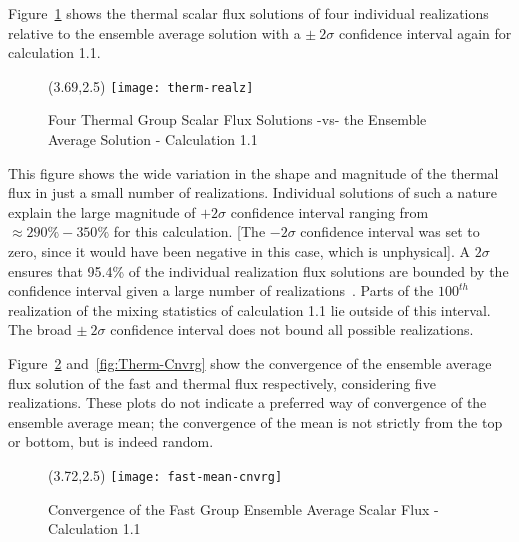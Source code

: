 \noindent
	\indent Figure~\ref{fig:Therm-Realz} shows the thermal scalar flux solutions of four individual 
	realizations relative to the ensemble average solution with a ${\pm \ 2\sigma}$ confidence
	interval again for calculation 1.1.
	\vspace{0.2in}
	\begin{figure}[htbp]
		\begin{center}
			\begin{minipage}[t]{3.69in}
			\begin{picture}(3.69,2.5)
	            	{\texttt{[image: therm-realz]}}
			\end{picture}
			\caption{\label{fig:Therm-Realz} Four Thermal Group Scalar Flux Solutions -vs- 
				the Ensemble Average Solution - Calculation 1.1}
			\end{minipage} %
		\end{center}
	\end{figure}	
	\vspace{-0.25in}
  	This figure shows the wide variation in the shape and magnitude of the thermal flux in
	just a small number of realizations.  Individual solutions of such a nature explain the large
	magnitude of ${+2\sigma}$ confidence interval ranging from ${\approx 290\%-350\%}$ for
	this calculation.  [The ${-2\sigma}$ confidence interval was set to zero, since it would have
	been negative in this case, which is unphysical].  A ${2\sigma}$ ensures that 95.4\% of 
	the individual realization flux solutions are bounded by the confidence interval given a large
	number of realizations~\cite{Lew:93}.  Parts of the ${100^{th}}$ realization of the mixing statistics
	of calculation 1.1 lie outside of this interval.  The broad ${\pm \ 2\sigma}$ confidence interval
	does not bound all possible realizations.  
	
\noindent
	\indent Figure~\ref{fig:Fast-Cnvrg} and~\ref{fig:Therm-Cnvrg} show the convergence of the
	ensemble average flux solution of the fast and thermal flux respectively, considering five
	realizations.  These plots do not indicate a preferred way of convergence of the ensemble
	average mean; the convergence of the mean is not strictly from the top or bottom, but is indeed
	random.
	\vspace{0.2in}
	\begin{figure}[htbp]
		\begin{center}
			\begin{minipage}[t]{3.72in}
			\begin{picture}(3.72,2.5)
	            	{\texttt{[image: fast-mean-cnvrg]}}
			\end{picture}
			\caption{\label{fig:Fast-Cnvrg} Convergence of the Fast Group Ensemble
				Average Scalar Flux - Calculation 1.1}
			\end{minipage} %
		\end{center}
	\end{figure}	
	\vspace{-0.25in} 
	
